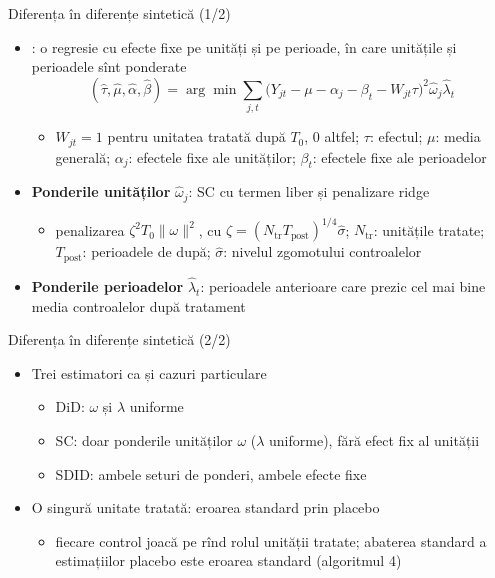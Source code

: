 \begin{frame}{Diferența în diferențe sintetică (1/2)}
\itemsize{\small}
\begin{itemize}
    \item {}: o regresie cu efecte fixe pe unități și pe perioade, în care unitățile și perioadele sînt ponderate \[ (\hat\tau, \hat\mu, \hat\alpha, \hat\beta) = \arg\min\sum_{j,t}\big(Y_{jt} - \mu - \alpha_j - \beta_t - W_{jt}\tau\big)^2\hat\omega_j\hat\lambda_t \]
    \begin{itemize}
        \item $W_{jt} = 1$ pentru unitatea tratată după $T_0$, 0 altfel; $\tau$: efectul; $\mu$: media generală; $\alpha_j$: efectele fixe ale unităților; $\beta_t$: efectele fixe ale perioadelor
    \end{itemize}
    \item \textbf{Ponderile unităților} $\hat\omega_j$: SC cu termen liber și penalizare ridge
    \begin{itemize}
        \item penalizarea $\zeta^2T_0\|\omega\|^2$, cu $\zeta = (N_{\mathrm{tr}}T_{\mathrm{post}})^{1/4}\hat\sigma$; $N_{\mathrm{tr}}$: unitățile tratate; $T_{\mathrm{post}}$: perioadele de după; $\hat\sigma$: nivelul zgomotului controalelor
    \end{itemize}
    \item \textbf{Ponderile perioadelor} $\hat\lambda_t$: perioadele anterioare care prezic cel mai bine media controalelor după tratament
\end{itemize}
\end{frame}

\begin{frame}{Diferența în diferențe sintetică (2/2)}
\itemsize{\small}
\begin{itemize}
    \item Trei estimatori ca și cazuri particulare
    \begin{itemize}
        \item DiD: $\omega$ și $\lambda$ uniforme
        \item SC: doar ponderile unităților $\omega$ ($\lambda$ uniforme), fără efect fix al unității
        \item SDID: ambele seturi de ponderi, ambele efecte fixe
    \end{itemize}
    \item O singură unitate tratată: eroarea standard prin placebo
    \begin{itemize}
        \item fiecare control joacă pe rînd rolul unității tratate; abaterea standard a estimațiilor placebo este eroarea standard (algoritmul 4)
    \end{itemize}
\end{itemize}
\end{frame}

